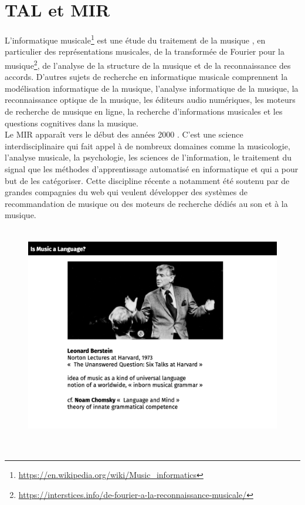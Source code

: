 \section{TAL et MIR}
L'informatique musicale\footnote{\url{https://en.wikipedia.org/wiki/Music_informatics}} est une étude du traitement de la musique \cite{book_muller}, en particulier des représentations musicales, de la transformée de Fourier pour la musique\footnote{\url{https://interstices.info/de-fourier-a-la-reconnaissance-musicale/}}, de l'analyse de la structure de la musique et de la reconnaissance des accords. D'autres sujets de recherche en informatique musicale comprennent la modélisation informatique de la musique, l'analyse informatique de la musique, la reconnaissance optique de la musique, les éditeurs audio numériques, les moteurs de recherche de musique en ligne, la recherche d'informations musicales et les questions cognitives dans la musique.\\
Le MIR apparaît vers le début des années 2000 \cite{MIR_1}. C’est une science interdisciplinaire qui fait appel à de nombreux domaines comme la musicologie, l’analyse musicale, la psychologie, les sciences de l’information, le traitement du
signal que les méthodes d’apprentissage automatisé en informatique et qui a pour but de les catégoriser. Cette discipline récente a notamment été soutenu par de grandes compagnies du web qui veulent développer des systèmes de recommandation de musique ou des moteurs de recherche dédiés au son et à la musique.\\\\
\begin{figure}[!h]
	\centering
	\includegraphics[height=85mm, width=125mm]{z_images/1_automatic_transcription/Bernstein.png}
\end{figure}\\
